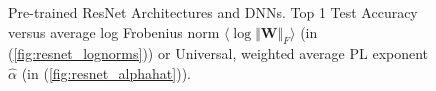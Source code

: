\begin{figure}[!htb]
   \centering
   \caption{
      Pre-trained
      ResNet Architectures and DNNs.  
      Top 1 Test Accuracy versus
      average log Frobenius norm $\langle\log\Vert\mathbf{W}\Vert_{F}\rangle$ (in (\ref{fig:resnet_lognorms}))
      or
      Universal, weighted average PL exponent $\hat{\alpha}$ (in (\ref{fig:resnet_alphahat})).
           }
   \label{fig:resnet}
\end{figure}


